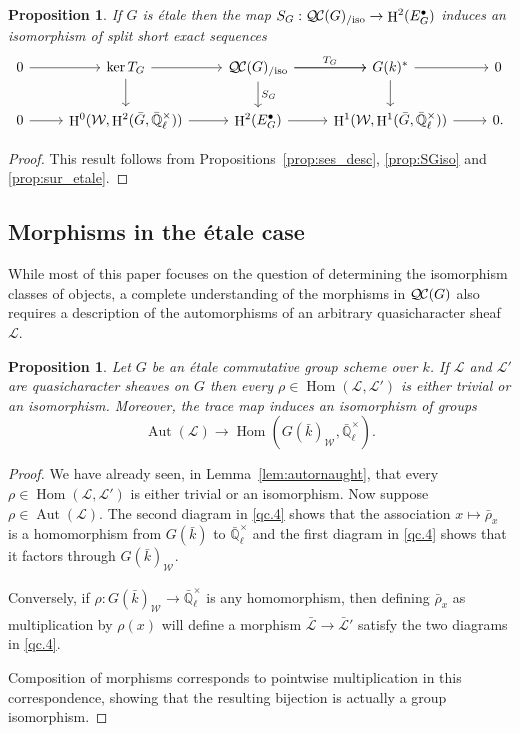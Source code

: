 \documentclass[10pt]{amsart}
\theoremstyle{plain}
\newtheorem{proposition}[theorem]{Proposition}
\theoremstyle{definition}
\theoremstyle{remark}
\newcommand{\EE}{\mathbb{\bar Q}_\ell}
\newcommand{\bFq}{\bar{k}}
\newcommand{\Fq}{k}
\newcommand{\EEx}{\EE^\times}
\newcommand{\Weil}[1]{\mathcal{W}_{#1}}
\DeclareMathOperator{\Aut}{Aut}
\DeclareMathOperator{\Hom}{Hom}
\DeclareMathOperator{\Hh}{H}
\newcommand{\TrFrob}[1]{T_{#1}}
\newcommand{\qcs}[1]{{\mathcal{#1}}}
\newcommand{\gqcs}[1]{{\mathcal{\bar #1}}}
\newcommand{\QC}{{\mathcal{Q\hskip-0.8pt C}}}
\newcommand{\QCiso}[1]{\QC(#1)_{/\text{iso}}}
\newcommand{\brho}{{\bar\rho}}
\begin{document}
\begin{proposition} \label{prop:etale-iso}
 If $G$ is \'etale then the map $S_G : \QCiso{G}\to \Hh^2(E^\bullet_G)$ induces an isomorphism of split short exact sequences
\[
\begin{tikzcd}
 0 \arrow{r} & \ker \TrFrob{G} \arrow{d} \arrow{r} & \QCiso{G}\arrow{d}{S_G} \arrow{r}{\TrFrob{G}} \arrow{r} & G(\Fq)^* \arrow{d} \arrow{r} & 0\\
  0 \arrow{r} & \Hh^0(\Weil{},\Hh^2({\bar G},\EEx)) \arrow{r} & \Hh^2(E^\bullet_G) \arrow{r} & \Hh^1(\Weil{},\Hh^1({\bar G},\EEx)) \arrow{r} & 0.
 \end{tikzcd}
 \]
\end{proposition}
\begin{proof}
This result follows from Propositions~\ref{prop:ses_desc}, \ref{prop:SGiso} and \ref{prop:sur_etale}.
\end{proof}

\subsection{Morphisms in the \'etale case}\label{ssec:mor-etale}

While most of this paper focuses on the question of determining the isomorphism classes of objects, a complete understanding of the morphisms in $\QC(G)$ also requires a description of the automorphisms of an arbitrary quasicharacter sheaf $\qcs{L}$.

\begin{proposition}\label{prop:autornaught_etale}
Let $G$ be an \'etale commutative group scheme over $\Fq$.
If $\qcs{L}$ and $\qcs{L}'$ are quasicharacter sheaves on $G$ then
every $\rho\in \Hom(\qcs{L},\qcs{L}')$ is either trivial or an isomorphism. Moreover, the trace map induces an isomorphism of groups
\[
\Aut(\qcs{L}) \to \Hom(G(\bFq)_{\Weil{}}, \EEx).
\]
\end{proposition}

\begin{proof}
We have already seen, in Lemma~\ref{lem:autornaught}, that every $\rho\in \Hom(\qcs{L},\qcs{L}')$ is either trivial or an isomorphism.
Now suppose $\rho \in \Aut(\qcs{L})$.
The second diagram in \ref{qc.4} shows that the association $x \mapsto \brho_x$ is a homomorphism from $G(\bFq)$ to $\EEx$ and the first diagram in \ref{qc.4} shows that it factors through $G(\bFq)_{\Weil{}}$.  

Conversely, if $\rho : G(\bFq)_{\Weil{}} \to \EEx$ is any homomorphism, then defining $\brho_x$ as multiplication by $\rho(x)$ will define a morphism $\gqcs{L} \to \gqcs{L}'$ satisfy the two diagrams in \ref{qc.4}.  

Composition of morphisms corresponds to pointwise multiplication in this correspondence, showing that the resulting bijection is actually a group isomorphism.
\end{proof}
\end{document}
